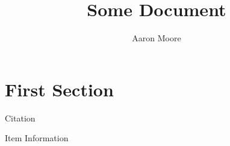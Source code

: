\documentclass{article}
\title{Some Document}
\author{Aaron Moore}
\date{}
\begin{document}
\maketitle \thispagestyle{fancy}
\section{First Section}
Citation \cite{itemid}
\lipsum[1-10]
\pagebreak{}
\begin{thebibliography}{9}
		Item Information

\end{thebibliography}
\end{document}
